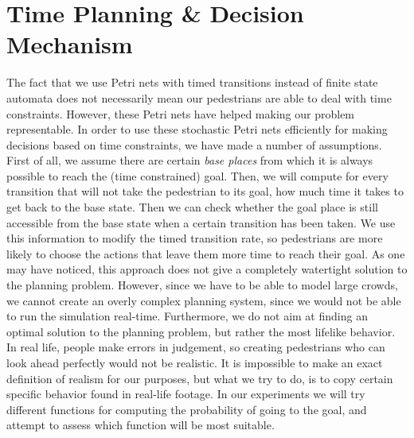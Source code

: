 \documentclass[11pt]{book}
\begin{document}
\section{Time Planning \& Decision Mechanism}
\label{timeplanning}
The fact that we use Petri nets with timed transitions instead of finite state automata does not necessarily mean our pedestrians are able to deal with time constraints. However, these Petri nets have helped making our problem representable. In order to use these stochastic Petri nets efficiently for making decisions based on time constraints, we have made a number of assumptions.\\
First of all, we assume there are certain \emph{base places} from which it is always possible to reach the (time constrained) goal. Then, we will compute for every transition that will not take the pedestrian to its goal, how much time it takes to get back to the base state. Then we can check whether the goal place is still accessible from the base state when a certain transition has been taken. We use this information to modify the timed transition rate, so pedestrians are more likely to choose the actions that leave them more time to reach their goal.
As one may have noticed, this approach does not give a completely watertight solution to the planning problem. However, since we have to be able to model large crowds, we cannot create an overly complex planning system, since we would not be able to run the simulation real-time. Furthermore, we do not aim at finding an optimal solution to the planning problem, but rather the most lifelike behavior. In real life, people make errors in judgement, so creating pedestrians who can look ahead perfectly would not be realistic. It is impossible to make an exact definition of realism for our purposes, but what we try to do, is to copy certain specific behavior found in real-life footage. In our experiments we will try different functions for computing the probability of going to the goal, and attempt to assess which function will be most suitable.
\end{document}
